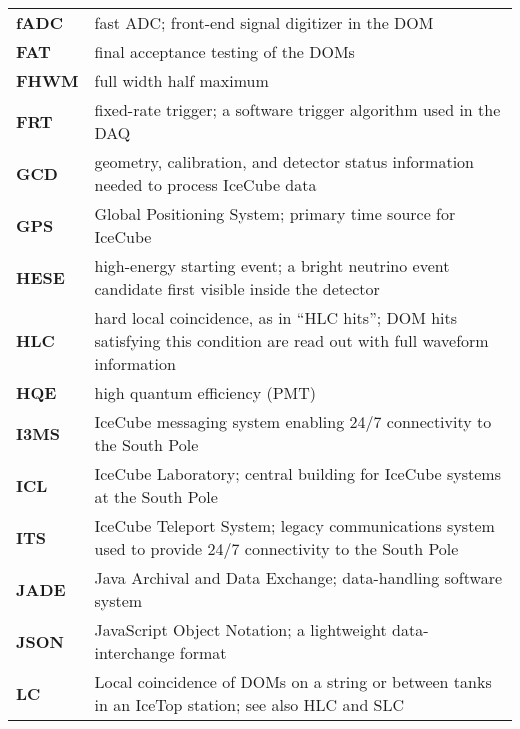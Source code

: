 \begin{longtable}{p{} p{}}
  \textbf{fADC} & fast ADC; front-end signal digitizer in the DOM \\
  
  \textbf{FAT} & final acceptance testing of the DOMs \\

  \textbf{FHWM} & full width half maximum \\

  \textbf{FRT} & fixed-rate trigger; a software trigger algorithm used
  in the DAQ \\

  \textbf{GCD} & geometry, calibration, and detector status information
  needed to process IceCube data \\
  
  \textbf{GPS} & Global Positioning System; primary time source for IceCube
  \\

  \textbf{HESE} & high-energy starting event; a bright neutrino event
  candidate first visible inside the detector \\
  
  \textbf{HLC} & hard local coincidence, as in ``HLC hits'';
  DOM hits satisfying this condition are read out with full
  waveform information \\

  \textbf{HQE} & high quantum efficiency (PMT) \\

  \textbf{I3MS} & IceCube messaging system enabling 24/7
  connectivity to the South Pole \\
  
  \textbf{ICL} & IceCube Laboratory; central building for IceCube systems
  at the South Pole \\

  \textbf{ITS} & IceCube Teleport System; legacy communications system used
  to provide 24/7 connectivity to the South Pole \\

  \textbf{JADE} & Java Archival and Data Exchange; data-handling software
  system \\

  \textbf{JSON} & JavaScript Object Notation; a lightweight
  data-interchange format \\
  
  \textbf{LC} & Local coincidence of DOMs on a string or between tanks in 
  an IceTop station; see also HLC and SLC \\
  

\end{longtable}
